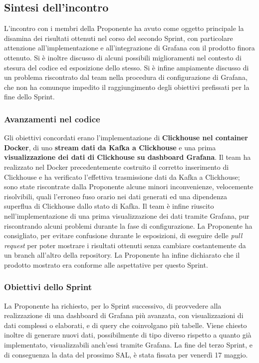 \documentclass[8pt]{article}
\begin{document}
\subsection{Sintesi dell'incontro}
L'incontro con i membri della Proponente ha avuto come oggetto principale la disamina dei risultati ottenuti nel corso del secondo Sprint, con particolare attenzione all'implementazione e all'integrazione di Grafana con il prodotto finora ottenuto. Si è inoltre discusso di alcuni possibili miglioramenti nel contesto di stesura del codice ed esposizione dello stesso. Si è infine ampiamente discusso di un problema riscontrato dal team nella procedura di configurazione di Grafana, che non ha comunque impedito il raggiungimento degli obiettivi prefissati per la fine dello Sprint.

\subsubsection{Avanzamenti nel codice}
Gli obiettivi concordati erano l'implementazione di \textbf{Clickhouse nel container Docker}, di uno \textbf{stream dati da Kafka a Clickhouse} e una prima \textbf{visualizzazione dei dati di Clickhouse su dashboard Grafana}. Il team ha realizzato nel Docker precedentemente costruito il corretto inserimento di Clickhouse e ha verificato l'effettiva trasmissione dati da Kafka a Clickhouse; sono state riscontrate dalla Proponente alcune minori inconvenienze, velocemente risolvibili, quali l'erroneo fuso orario nei dati generati ed una dipendenza superflua di Clickhouse dallo stato di Kafka. Il team è infine riuscito nell'implementazione di una prima visualizzazione dei dati tramite Grafana, pur riscontrando alcuni problemi durante la fase di configurazione. La Proponente ha consigliato, per evitare confusione durante le esposizioni, di eseguire delle \textit{pull request} per poter mostrare i risultati ottenuti senza cambiare costantemente da un branch all'altro della repository. La Proponente ha infine dichiarato che il prodotto mostrato era conforme alle aspettative per questo Sprint.

\subsubsection{Obiettivi dello Sprint}
La Proponente ha richiesto, per lo Sprint successivo, di provvedere alla realizzazione di una dashboard di Grafana più avanzata, con visualizzazioni di dati complessi o elaborati, e di query che coinvolgano più tabelle. Viene chiesto inoltre di generare nuovi dati, possibilmente di tipo diverso rispetto a quanto già implementato, visualizzabili anch'essi tramite Grafana. La fine del terzo Sprint, e di conseguenza la data del prossimo SAL, è stata fissata per venerdì 17 maggio. 
\end{document}
